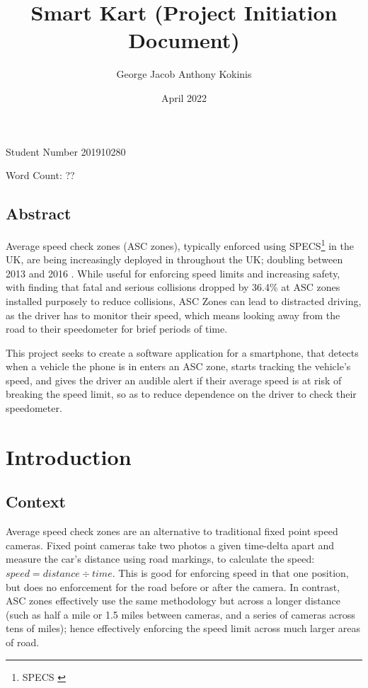 \documentclass[11pt, a4paper, notitlepage]{report}
\title{Smart Kart (Project Initiation Document)}
\date{April 2022}
\author{George Jacob Anthony Kokinis}
\begin{document}
\maketitle
\begin{center}
    Student Number 201910280
    
    Word Count: ?? %
\end{center}
\newpage
\section{Abstract}
Average speed check zones (ASC zones), typically enforced using SPECS\footnote{SPECS \citep{specsjenop}} in the UK, are being increasingly deployed in throughout the UK; doubling between 2013 and 2016 \citep{BBCSpeedCameraDoubled}. While useful for enforcing speed limits and increasing safety, with \citet{owenAllsop} finding that fatal and serious collisions dropped by 36.4\% at ASC zones installed purposely to reduce collisions, ASC Zones can lead to distracted driving, as the driver has to monitor their speed, which means looking away from the road to their speedometer for brief periods of time.

This project seeks to create a software application for a smartphone, that detects when a vehicle the phone is in enters an ASC zone, starts tracking the vehicle's speed, and gives the driver an audible alert if their average speed is at risk of breaking the speed limit, so as to reduce dependence on the driver to check their speedometer.

\tableofcontents

\chapter{Introduction}
\section{Context}\label{sec:Context}
Average speed check zones are an alternative to traditional fixed point speed cameras. Fixed point cameras take two photos a given time-delta apart and measure the car's distance using road markings, to calculate the speed: $ speed = distance \div time $. This is good for enforcing speed in that one position, but does no enforcement for the road before or after the camera. In contrast, ASC zones effectively use the same methodology but across a longer distance (such as half a mile or 1.5 miles between cameras, and a series of cameras across tens of miles); hence effectively enforcing the speed limit across much larger areas of road.
\end{document}
